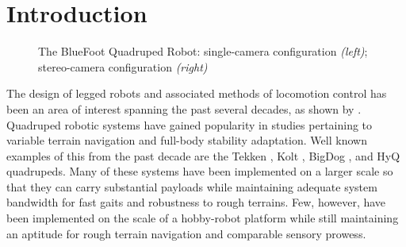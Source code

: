 \chapter{Introduction}

	\begin{figure}[h!]
		\centering
		\caption{The BlueFoot Quadruped Robot: single-camera configuration \emph{(left)}; stereo-camera configuration \emph{(right)}}
		\label{fig::bluefoot}
	\end{figure}

		The design of legged robots and associated methods of locomotion control has been an area of interest spanning the past several decades, as shown by		
		\cite{
		McGhee1965,
		Hodgins1991, 
		Altendorfer2001, 
		Kolter2008
		}.
		Quadruped robotic systems have gained popularity in studies pertaining to variable terrain navigation and full-body stability adaptation. Well known examples of this from the past decade are the Tekken \cite{Fukuoka2003}, Kolt \cite{Estremera2006}, BigDog \cite{BigDog2008}, and HyQ \cite{Semini2010_PHD} quadrupeds. Many of these systems have been implemented on a larger scale so that they can carry substantial payloads while maintaining adequate system bandwidth for fast gaits and robustness to rough terrains. Few, however, have been implemented on the scale of a hobby-robot platform while still maintaining an aptitude for rough terrain navigation and comparable sensory prowess.

